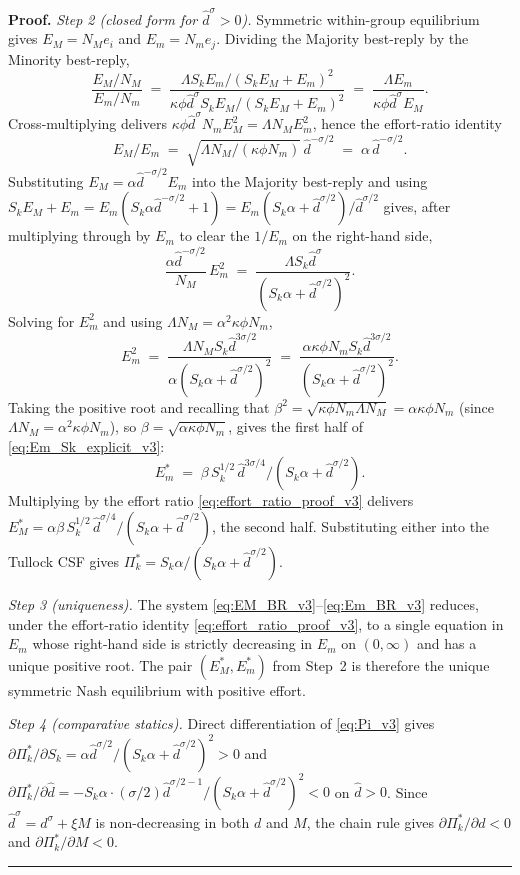 \documentclass[11pt,twoside]{extarticle}
\newenvironment{proof}[1][Proof]{\noindent \textbf{#1.} }{\ \rule{0.5em}{0.5em}}
\begin{document}
\begin{proof}
\emph{Step 2 (closed form for $\hat d^\sigma>0$).} Symmetric within-group equilibrium gives $E_M=N_Me_i$ and $E_m=N_me_j$. Dividing the Majority best-reply by the Minority best-reply,
\[
\frac{E_M/N_M}{E_m/N_m}\;=\;\frac{\Lambda S_kE_m/(S_kE_M+E_m)^2}{\kappa\phi\hat d^\sigma S_kE_M/(S_kE_M+E_m)^2}\;=\;\frac{\Lambda E_m}{\kappa\phi\hat d^\sigma E_M}.
\]
Cross-multiplying delivers $\kappa\phi\hat d^\sigma N_m E_M^2=\Lambda N_M E_m^2$, hence the effort-ratio identity
\begin{equation}\label{eq:effort_ratio_proof_v3}
E_M/E_m\;=\;\sqrt{\Lambda N_M/(\kappa\phi N_m)}\,\hat d^{-\sigma/2}\;=\;\alpha\,\hat d^{-\sigma/2}.
\end{equation}
Substituting $E_M=\alpha\hat d^{-\sigma/2}E_m$ into the Majority best-reply and using
$S_kE_M+E_m=E_m(S_k\alpha\hat d^{-\sigma/2}+1)=E_m(S_k\alpha+\hat d^{\sigma/2})/\hat d^{\sigma/2}$
gives, after multiplying through by $E_m$ to clear the $1/E_m$ on the right-hand side,
\[
\frac{\alpha\hat d^{-\sigma/2}}{N_M}\,E_m^2\;=\;\frac{\Lambda S_k\hat d^\sigma}{(S_k\alpha+\hat d^{\sigma/2})^2}.
\]
Solving for $E_m^2$ and using $\Lambda N_M=\alpha^2\kappa\phi N_m$,
\[
E_m^2\;=\;\frac{\Lambda N_M S_k\hat d^{3\sigma/2}}{\alpha(S_k\alpha+\hat d^{\sigma/2})^2}\;=\;\frac{\alpha\kappa\phi N_m S_k\hat d^{3\sigma/2}}{(S_k\alpha+\hat d^{\sigma/2})^2}.
\]
Taking the positive root and recalling that $\beta^2=\sqrt{\kappa\phi N_m\Lambda N_M}=\alpha\kappa\phi N_m$ (since $\Lambda N_M=\alpha^2\kappa\phi N_m$), so $\beta=\sqrt{\alpha\kappa\phi N_m}$, gives the first half of \autoref{eq:Em_Sk_explicit_v3}:
\[
E_m^*\;=\;\beta\,S_k^{1/2}\,\hat d^{3\sigma/4}/(S_k\alpha+\hat d^{\sigma/2}).
\]
Multiplying by the effort ratio \autoref{eq:effort_ratio_proof_v3} delivers $E_M^*=\alpha\beta\,S_k^{1/2}\,\hat d^{\sigma/4}/(S_k\alpha+\hat d^{\sigma/2})$, the second half. Substituting either into the Tullock CSF gives $\Pi_k^*=S_k\alpha/(S_k\alpha+\hat d^{\sigma/2})$.

\emph{Step 3 (uniqueness).} The system \autoref{eq:EM_BR_v3}--\autoref{eq:Em_BR_v3} reduces, under the effort-ratio identity \autoref{eq:effort_ratio_proof_v3}, to a single equation in $E_m$ whose right-hand side is strictly decreasing in $E_m$ on $(0,\infty)$ and has a unique positive root. The pair $(E_M^*,E_m^*)$ from Step~2 is therefore the unique symmetric Nash equilibrium with positive effort.

\emph{Step 4 (comparative statics).} Direct differentiation of \autoref{eq:Pi_v3} gives
$\partial\Pi_k^*/\partial S_k=\alpha\hat d^{\sigma/2}/(S_k\alpha+\hat d^{\sigma/2})^2>0$ and $\partial\Pi_k^*/\partial\hat d=-S_k\alpha\cdot(\sigma/2)\hat d^{\sigma/2-1}/(S_k\alpha+\hat d^{\sigma/2})^2<0$ on $\hat d>0$. Since $\hat d^\sigma=d^\sigma+\xi M$ is non-decreasing in both $d$ and $M$, the chain rule gives $\partial\Pi_k^*/\partial d<0$ and $\partial\Pi_k^*/\partial M<0$.
\end{proof}
\end{document}
